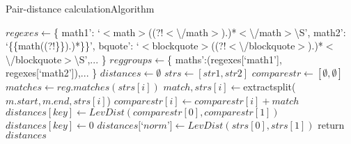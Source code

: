 \documentclass[t]{beamer}
\newcommand{\tab}[1]{\hspace{.08\textwidth}{#1}} %
\begin{document}
\begin{frame}{Pair-distance calculation}{Algorithm}
  \tiny
  \begin{algorithmic}
    \State $regexes \gets $\{
    \Statex \tab`math1': `$<$math$>$((?!$<${\textbackslash}/math$>$).)*$<${\textbackslash}/math$>${\textbackslash}S',
    \Statex \tab`math2': `\{\{math((?!\}\}).)*\}\}',
    \Statex \tab`bquote': `$<$blockquote$>$((?!$<${\textbackslash}/blockquote$>$).)*$<${\textbackslash}/blockquote$>${\textbackslash}S',...
    \Statex\}
    \State $reggroups \gets $\{\label{dist-calc-groups}
    \Statex  \tab`maths':(regexes[`math1'], regexes[`math2']),...
    \Statex \}
    \State $distances \gets \emptyset$
    \State $strs \gets [str1, str2]$
    \State $comparestr \gets [\emptyset , \emptyset]$
    \State $matches \gets reg.matches(strs[i])$
    \State $match, strs[i] \gets $extractsplit($m.start, m.end, strs[i]$)
    \State $comparestr[i] \gets comparestr[i] + match$
    \EndFor
    \EndFor
    \State $distances[key] \gets LevDist(comparestr[0], comparestr[1])$ \label{mprocess-spawn}
    \Else
    \State $distances[key] \gets 0$
    \EndIf
    \EndFor
    \State $distances[$`$norm$'$] \gets LevDist(strs[0], strs[1])$
    \State return $distances$\label{mprocess-return}
    \EndFunction
  \end{algorithmic}
\end{frame}
\end{document}
